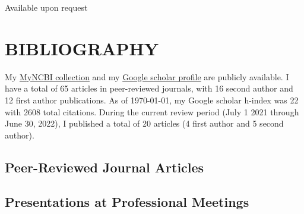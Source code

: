 \documentclass[11pt]{cv_wakeforest_article}
\newcommand{\AR}[1]{#1}  %
\newcommand{\mysection}[1]{\section*{#1}}
\newcommand{\mysubsection}[1]{\subsection*{#1}}
\begin{document}
Available upon request

\mysection{BIBLIOGRAPHY}




My \href{https://www.ncbi.nlm.nih.gov/myncbi/byron.jaeger.1/bibliography/public/}{MyNCBI collection} and my \href{https://scholar.google.com/citations?user=4IKD_roAAAAJ&hl=en}{Google scholar profile} are publicly available. I have a total of 65 articles in peer-reviewed journals, with 16 second author and 12 first author publications. As of \today, my Google scholar h-index was 22 with 2608 total citations. \AR{During the current review period (July 1 2021 through June 30, 2022), I published a total of 20 articles (4 first author and 5 second author)}.

\mysubsection{Peer-Reviewed Journal Articles}


%






\mysubsection{Presentations at Professional Meetings}
\end{document}

